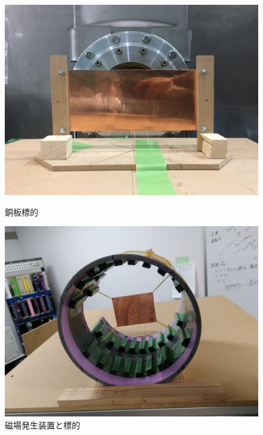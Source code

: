 \begin{figure}[H]
  \begin{minipage}{0.45\hsize}
    \begin{center}
      \includegraphics[width=1\textwidth]{figure/tajima/cu_target.jpg}
      \caption{銅板標的}
      \label{tar_cu}
    \end{center}
  \end{minipage}
  \hfill
  \begin{minipage}{0.45\hsize}
    \begin{center}
      \includegraphics[width=1\textwidth]{figure/tajima/mag.jpg}
      \caption{磁場発生装置と標的 \protect\footnotemark}
      \label{tar_mag}
    \end{center}
  \end{minipage}
\end{figure}

